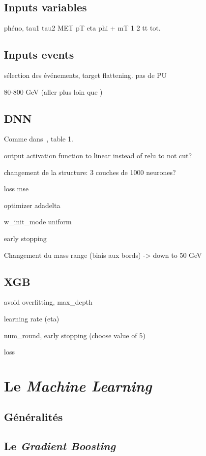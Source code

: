 \subsection*{Inputs variables}
phéno, tau1 tau2 MET pT eta phi + mT 1 2 tt tot.
\subsection*{Inputs events}
sélection des événements, target flattening. pas de PU

80-800 GeV (aller plus loin que \cite{BARTSCHI201929})
\subsection*{DNN}



Comme dans~\cite{BARTSCHI201929}, table 1.

output activation function to linear instead of relu to not cut?

changement de la structure: 3 couches de 1000 neurones?

loss mse

optimizer adadelta

w\_init\_mode uniform

early stopping

Changement du mass range (biais aux bords) -> down to 50 GeV

\subsection*{XGB}
avoid overfitting, max\_depth

learning rate (eta)

num\_round, early stopping (choose value of 5)

loss



\section{Le \emph{Machine Learning}}
\subsection{Généralités}
\subsection{Le \emph{Gradient Boosting}}
